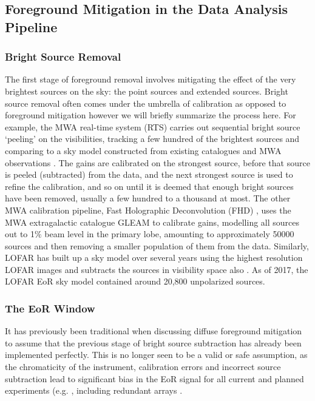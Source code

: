 \subsection{Foreground Mitigation in the Data Analysis Pipeline}
\subsubsection{Bright Source Removal}
The first stage of foreground removal involves mitigating the effect of the very brightest sources on the sky: the point sources and extended sources. Bright source removal often comes under the umbrella of calibration as opposed to foreground mitigation however we will briefly summarize the process here. For example, the MWA real-time system (RTS) \cite{Mitchell2008ISTSP...2..707M} carries out sequential bright source `peeling' on the visibilities, tracking a few hundred of the brightest sources and comparing to a sky model constructed from existing catalogues and MWA observations \cite{Carroll2016MNRAS.461.4151C}. The gains are calibrated on the strongest source, before that source is peeled (subtracted) from the data, and the next strongest source is used to refine the calibration, and so on until it is deemed that enough bright sources have been removed, usually a few hundred to a thousand at most. The other MWA calibration pipeline, Fast Holographic Deconvolution (FHD) \cite{Sullivan2012ApJ...759...17S}, uses the MWA extragalactic catalogue GLEAM \cite{hurleywalker17} to calibrate gains, modelling all sources out to 1$\%$ beam level in the primary lobe, amounting to approximately 50000 sources \cite{Barry2019arXiv190102980B} and then removing a smaller population of them from the data. Similarly, LOFAR has built up a sky model over several years using the highest resolution LOFAR images and subtracts the sources in visibility space also \cite{Yata2015MNRAS.449.4506Y,Yata2013AA...550A.136Y}. As of 2017, the LOFAR EoR sky model contained around 20,800 unpolarized sources. 

\subsubsection{The EoR Window}
\label{sec:wedge}

It has previously been traditional when discussing diffuse foreground mitigation to assume that the previous stage of bright source subtraction has already been implemented perfectly. This is no longer seen to be a valid or safe assumption, as the chromaticity of the instrument, calibration errors and incorrect source subtraction lead to significant bias in the EoR signal for all current and planned experiments (e.g. \cite{ EW2017MNRAS.470.1849E,Procopio2017PASA...34...33P,Barry2016MNRAS.461.3135B,Patil2016MNRAS.463.4317P,Datta2010ApJ...724..526D,Liu2009MNRAS.394.1575L}, including redundant arrays \cite{Byrne2019ApJ...875...70B}. 


